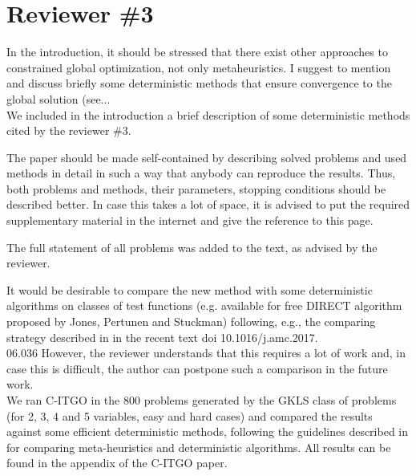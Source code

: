 
\section*{Reviewer \#3}

{\color{red} In the introduction, it should be stressed that there exist other approaches to constrained global optimization, not only metaheuristics. I suggest to mention and discuss briefly some deterministic methods that ensure convergence to the global solution (see... }\\

We included in the introduction a brief description of some deterministic methods cited by the reviewer \#3.


\vspace{1cm}


{\color{red} The paper should be made self-contained by describing solved problems and used methods in detail in such a way that anybody can reproduce the results. Thus, both problems and methods, their parameters, stopping conditions should be described better. In case this takes a lot of space, it is advised to put the required supplementary material in the internet and give the reference to this page. }


\vspace{1cm}


The full statement of all problems was added to the text, as advised by the reviewer.


\vspace{1cm}

{\color{red} It would be desirable to compare the new method with some deterministic algorithms on classes of test functions (e.g. available for free DIRECT algorithm proposed by Jones, Pertunen and Stuckman) following, e.g., the comparing strategy described in in the recent text doi 10.1016/j.amc.2017.\\06.036 However, the reviewer understands that this requires a lot of work and, in case this is difficult, the author can postpone such a comparison in the future work. } \\

We ran C-ITGO in the 800 problems generated by the GKLS class of problems (for 2, 3, 4 and 5 variables, easy and hard cases) and compared the results against some efficient deterministic methods, following the guidelines described in \cite{NAT} for comparing meta-heuristics and deterministic algorithms. All results can be found in the appendix of the C-ITGO paper.

